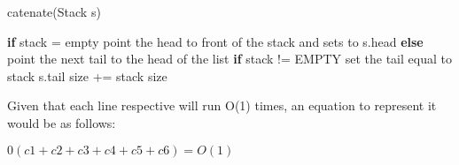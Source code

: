 \documentclass[12pt]{article}
\begin{document}
 \linebreak
 \begin{algorithm}[H]
\caption{catenate(Stack s)}
\begin{algorithmic}[H]
\State \textbf{if} stack = empty 
\State \qquad point the head to front of the stack and sets to s.head
\State \textbf{else}
\State \qquad point the next tail to the head of the list
\State \textbf{if} stack != EMPTY
\State \qquad \qquad set the tail equal to stack s.tail
\State size += stack size 
\end{algorithmic}
\end{algorithm}
Given that each line respective will run  O(1) times, an equation to represent it would be as follows: \\
\begin{center}
$0(c1 + c2 + c3 + c4 + c5 + c6) = O(1)$ \\
\end{center}
\linebreak
\end{document}

